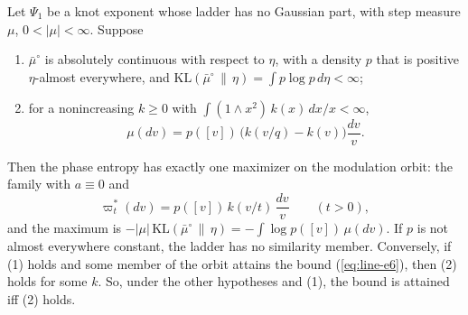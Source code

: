 \begin{theorem}
\label{thm:phase-entropy-modulated-selection}
\leanok
{}
Let $\Psi_1$ be a knot exponent whose ladder has no Gaussian part, with step measure $\mu$,
$0 < |\mu| < \infty$. Suppose
\begin{enumerate}
\item $\bar\mu^\circ$ is absolutely continuous with respect to $\eta$, with a density $p$ that is
positive $\eta$-almost everywhere, and
$\mathrm{KL}(\bar\mu^\circ \,\|\, \eta) = \int p\log p\,d\eta < \infty$;
\item for a nonincreasing $k \ge 0$ with $\int(1 \wedge x^2)\,k(x)\,dx/x < \infty$,
\[
  \mu(dv) = p([v])\,\bigl(k(v/q) - k(v)\bigr)\frac{dv}{v}.
\]
\end{enumerate}
Then the phase entropy has exactly one maximizer on the modulation orbit: the family with
$a \equiv 0$ and
\[
  \varpi^*_t(dv) = p([v])\,k(v/t)\,\frac{dv}{v} \qquad (t > 0),
\]
and the maximum is
$-|\mu|\,\mathrm{KL}(\bar\mu^\circ \,\|\, \eta) = -\int\log p([v])\,\mu(dv)$. If $p$ is not
almost everywhere constant, the ladder has no similarity member.
Conversely, if (1) holds and some member of the orbit attains the bound (\ref{eq:line-e6}), then
(2) holds for some $k$. So, under the other hypotheses and (1), the bound is attained iff (2)
holds.

\end{theorem}
